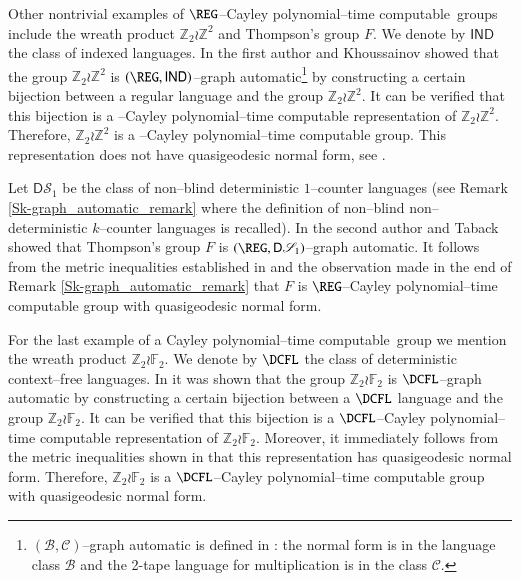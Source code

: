 \documentclass[article,12pt]{elsarticle}
\newcommand\polyC{Cayley polynomial--time computable}
\begin{document}
Other nontrivial examples of 
$\REG$--\polyC\ groups include 
the wreath product $\mathbb{Z}_2 \wr \mathbb{Z}^2$ 
and Thompson's group $F$. 
We denote by $\mathsf{IND}$ the class of indexed 
languages. 
In \cite[\S~5]{BK15}  the first author and 
Khoussainov showed that 
the group $\mathbb{Z}_2 \wr \mathbb{Z}^2$ is 
$(\REG,\mathsf{IND})$--graph 
automatic\footnote{
	$(\mathcal{B,C})$--graph automatic is defined in \cite{ElderTabackCgraph}: the normal form is in the language class $\mathcal B$ and the 2-tape language for multiplication is in the class $\mathcal C$. }
by constructing  
a certain bijection between a regular language and 
the group $\mathbb{Z}_2 \wr \mathbb{Z}^2$.  
It can be verified that this bijection  
is a \REG--Cayley polynomial--time computable 
representation of  $\mathbb{Z}_2 \wr \mathbb{Z}^2$. 
Therefore,  $\mathbb{Z}_2 \wr \mathbb{Z}^2$ 
is a \REG--Cayley polynomial--time computable 
group. This representation does not have 
quasigeodesic normal form, see \cite[Remark~9]{BK15}.

 

Let $\mathsf{D}\mathscr{S}_1$ be the class of 
non--blind deterministic $1$--counter languages 
(see Remark \ref{Sk-graph_automatic_remark} where 
the definition of non--blind 
non--deterministic $k$--counter languages is recalled). 
In \cite{ElderTaback15_Thompson} the second author 
and Taback showed that Thompson's group $F$ is 
$\left(\REG,\mathsf{D}\mathscr{S}_1 \right)$--graph 
automatic. It follows from the metric inequalities 
established in 
\cite[Proposition~3.3]{ElderTaback15_Thompson} 
and the observation made in the end of 
Remark \ref{Sk-graph_automatic_remark} 
that $F$ is $\REG$--Cayley polynomial--time 
computable group with quasigeodesic normal form. 

For the last example of a 
\polyC\ group we mention the wreath 
product $\mathbb{Z}_2 \wr \mathbb{F}_2$. 
We denote by $\DCFL$ the class of deterministic context--free languages.
In \cite[\S~4]{BK15}
it was shown that the group $\mathbb{Z}_2 \wr \mathbb{F}_2$ 
is $\DCFL$--graph automatic
by constructing a certain bijection between 
a $\DCFL$
language and the group $\mathbb{Z}_2 \wr \mathbb{F}_2$. It can be verified 
that this bijection is a $\DCFL$--Cayley 
polynomial--time computable representation of 
$\mathbb{Z}_2 \wr \mathbb{F}_2$. Moreover, it immediately 
follows from the metric 
inequalities shown in \cite[Theorem~5]{BK15} 
that this representation has quasigeodesic 
normal form. 
Therefore, $\mathbb{Z}_2 \wr \mathbb{F}_2$ is 
a $\DCFL$--Cayley polynomial--time 
computable group with quasigeodesic 
normal form.
\end{document}
